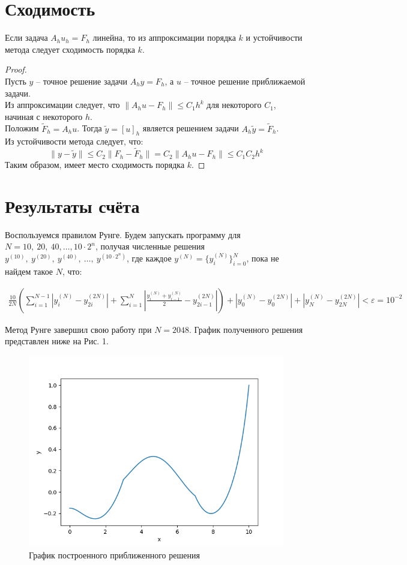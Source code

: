 \documentclass[titlepage]{article}
\def\l{\left}
\def\r{\right}
\def\le{\leqslant}
\begin{document}
\section{Сходимость}
\begin{theorem}
	Если задача $A_h u_h = F_h$ линейна, то из аппроксимации порядка $k$ и устойчивости метода следует сходимость порядка $k$.
\end{theorem}
\begin{proof}
\hfill \\
Пусть $y$ -- точное решение задачи $A_hy = F_h$, а $u$ -- точное решение приближаемой задачи. \\
Из аппроксимации следует, что $\|A_hu - F_h\| \le C_1h^k$ для некоторого $C_1$, начиная с некоторого $h$. \\
Положим $\tilde F_h = A_h u$. Тогда $\tilde y = [u]_h$ является решением задачи $A_h \tilde y = \tilde F_h$. \\
Из устойчивости метода следует, что:
$$\| y - \tilde y \| \le C_2 \| F_h - \tilde F_h \| = C_2 \| A_h u - F_h \| \le C_1 C_2 h^k$$ 
Таким образом, имеет место сходимость порядка $k$.
\end{proof}

\section{Результаты счёта}
Воспользуемся правилом Рунге. Будем запускать программу для $N = 10,\ 20,\ 40,\dots,10\cdot2^n$, получая численные решения $y^{(10)},\ y^{(20)},\  y^{(40)},\ \dots ,\  y^{(10\cdot2^n)}$, где каждое $y^{(N)} = \{y_i^{(N)}\}_{i=0}^{N}$, пока не найдем такое $N$, что:

\begin{gather*}
	\frac{10}{2N} \l( \sum_{i=1}^{N-1}{\l| y_i^{(N)} - y_{2i}^{(2N)} \r|} + \sum_{i=1}^{N}{ \l| \frac{y_i^{(N)} + y_{i-1}^{(N)}}{2}  - y_{2i-1}^{(2N)} \r|} \r) + \l|y_0^{(N)} - y_{0}^{(2N)}\r| + \l|y_N^{(N)} - y_{2N}^{(2N)}\r| < \varepsilon = 10^{-2}
\end{gather*}

Метод Рунге завершил свою работу при $N = 2048$. График полученного решения представлен ниже на Рис. 1.

\begin{figure}[h]
\includegraphics[width=150mm]{Figure_1.png}		
	\caption{График построенного приближенного решения}
\end{figure}
	
\end{document}
